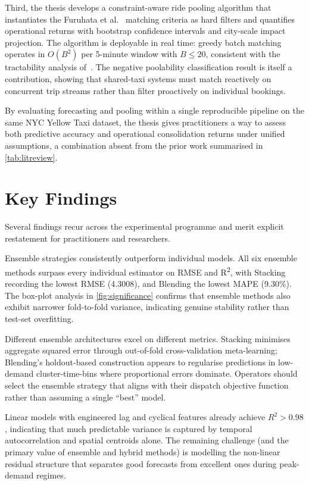 Third, the thesis develops a constraint-aware ride pooling algorithm that instantiates the Furuhata et al.~\parencite{furuhata2013ridesharing} matching criteria as hard filters and quantifies operational returns with bootstrap confidence intervals and city-scale impact projection. The algorithm is deployable in real time: greedy batch matching operates in $O(B^2)$ per 5-minute window with $B \leq 20$, consistent with the tractability analysis of~\parencite{agatz2012ridesharing}. The negative poolability classification result is itself a contribution, showing that shared-taxi systems must match reactively on concurrent trip streams rather than filter proactively on individual bookings.

By evaluating forecasting and pooling within a single reproducible pipeline on the same NYC Yellow Taxi dataset, the thesis gives practitioners a way to assess both predictive accuracy and operational consolidation returns under unified assumptions, a combination absent from the prior work summarised in \autoref{tab:litreview}.

\section{Key Findings}

Several findings recur across the experimental programme and merit explicit restatement for practitioners and researchers.

Ensemble strategies consistently outperform individual models. All six ensemble methods surpass every individual estimator on RMSE and R\textsuperscript{2}, with Stacking recording the lowest RMSE (4.3008), and Blending the lowest MAPE (9.30\%). The box-plot analysis in \autoref{fig:significance} confirms that ensemble methods also exhibit narrower fold-to-fold variance, indicating genuine stability rather than test-set overfitting.

Different ensemble architectures excel on different metrics. Stacking minimises aggregate squared error through out-of-fold cross-validation meta-learning; Blending's holdout-based construction appears to regularise predictions in low-demand cluster-time-bins where proportional errors dominate. Operators should select the ensemble strategy that aligns with their dispatch objective function rather than assuming a single ``best'' model.

Linear models with engineered lag and cyclical features already achieve $R^2 > 0.98$, indicating that much predictable variance is captured by temporal autocorrelation and spatial centroids alone. The remaining challenge (and the primary value of ensemble and hybrid methods) is modelling the non-linear residual structure that separates good forecasts from excellent ones during peak-demand regimes.

